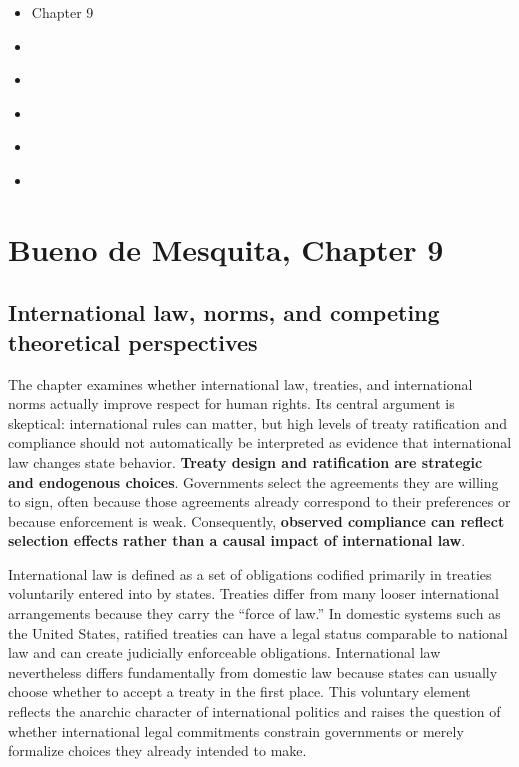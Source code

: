 \begin{itemize}
    \item [***] \textcite{buenodemesquitaPrinciplesInternationalPolitics2013}{Chapter 9}
    \item [***] \textcite{careyUnderstandingJournalistKillings2021}
    \item \textcite{hafner-burtonHumanRightsGlobalizing2005}
    \item \textcite{greitensSurveillanceSecurityLiberal2020}
    \item \textcite{murdieShamingBlamingUsing2012}
    \item \textcite{vonsteinMakingPromisesKeeping2016}
\end{itemize}

\section{Bueno de Mesquita, Chapter 9}

\subsection{International law, norms, and competing theoretical perspectives}

The chapter examines whether international law, treaties, and international norms actually improve respect for human rights. Its central argument is skeptical: international rules can matter, but high levels of treaty ratification and compliance should not automatically be interpreted as evidence that international law changes state behavior. \textbf{Treaty design and ratification are strategic and endogenous choices}. Governments select the agreements they are willing to sign, often because those agreements already correspond to their preferences or because enforcement is weak. Consequently, \textbf{observed compliance can reflect selection effects rather than a causal impact of international law}.

International law is defined as a set of obligations codified primarily in treaties voluntarily entered into by states. Treaties differ from many looser international arrangements because they carry the ``force of law.'' In domestic systems such as the United States, ratified treaties can have a legal status comparable to national law and can create judicially enforceable obligations. International law nevertheless differs fundamentally from domestic law because states can usually choose whether to accept a treaty in the first place. This voluntary element reflects the anarchic character of international politics and raises the question of whether international legal commitments constrain governments or merely formalize choices they already intended to make.

